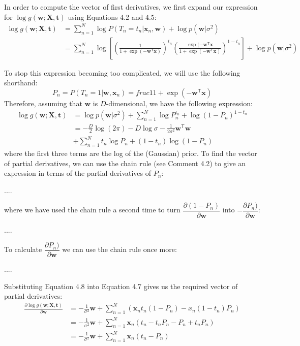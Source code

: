 In order to compute the vector of first derivatives, we first expand our expression
for $\log g(\mathbf{w}; \mathbf{X}, \mathbf{t})$
using Equations 4.2 and 4.5:
\begin{align*}
\log g(\mathbf{w}; \mathbf{X}, \mathbf{t}) & =
\sum_{n=1}^{N} \log P(T_n = t_n | \mathbf{x}_n, \mathbf{w}) + \log p(\mathbf{w} | \sigma^2) \\
& = \sum_{n=1}^{N} \log \left[
\left(
\frac{1}{1 + \exp( -\mathbf{w}^{\mathsf{T}} \mathbf{x} )}
\right)^{t_n}
\left(
\frac{\exp( -\mathbf{w}^{\mathsf{T}} \mathbf{x}}{1 + \exp( -\mathbf{w}^{\mathsf{T}} \mathbf{x} )}
\right)^{1 - t_n}
\right] + \log p(\mathbf{w} | \sigma^2)
\end{align*}

To stop this expression becoming too complicated, we will use the following shorthand:
\begin{equation*}
P_{n} = P(T_n = 1 | \mathbf{w}, \mathbf{x}_n) = 
frac{1}{1 + \exp( -\mathbf{w}^{\mathsf{T}} \mathbf{x} )}
\end{equation*}
Therefore, assuming that $\mathbf{w}$ is $D$-dimensional, we have the following expression:
\begin{align*}
\log g(\mathbf{w}; \mathbf{X}, \mathbf{t}) & =
\log p(\mathbf{w} | \sigma^2) +
\sum_{n=1}^{N} \log P_{n}^{t_n} + \log(1 - P_{n})^{1-t_n} \\
& = -\frac{D}{2} \log(2\pi) - D \log \sigma - \frac{1}{2\sigma^2} \mathbf{w}^{\mathsf{T}}\mathbf{w} \\
& + \sum_{n=1}^{N} t_{n} \log P_{n} + (1 - t_n) \log (1 - P_n)
\end{align*}
where the first three terms are the log of the (Gaussian) prior. To find the vector of
partial derivatives, we can use the chain rule (see Comment 4.2) to give an expression
in terms of the partial derivatives of $P_n$:

....

where we have used the chain rule a second time to turn
$\dfrac{\partial (1 - P_n)}{\partial \mathbf{w}}$ into
$-\dfrac{\partial P_n)}{\partial \mathbf{w}}$:

....

To calculate $\dfrac{\partial P_n)}{\partial \mathbf{w}}$ we can use the chain rule once more:

....

Substituting Equation 4.8 into Equation 4.7 gives us the required vector of partial
derivatives:
\begin{align}
\frac{\partial \log g(\mathbf{w}; \mathbf{X}, \mathbf{t})}{\partial \mathbf{w}} & =
-\frac{1}{\sigma^2} \mathbf{w} +
\sum_{n=1}^{N} \left(
  \mathbf{x}_n t_n (1 - P_n) - x_n (1 - t_n) P_n
\right) \nonumber \\
& = -\frac{1}{\sigma^2} \mathbf{w} +
\sum_{n=1}^{N} \mathbf{x}_n \left(
t_n - t_n P_n - P_n + t_n P_n
\right) \nonumber \\
& = -\frac{1}{\sigma^2} \mathbf{w} +
\sum_{n=1}^{N} \mathbf{x}_n \left( t_n - P_n \right)
\end{align}


